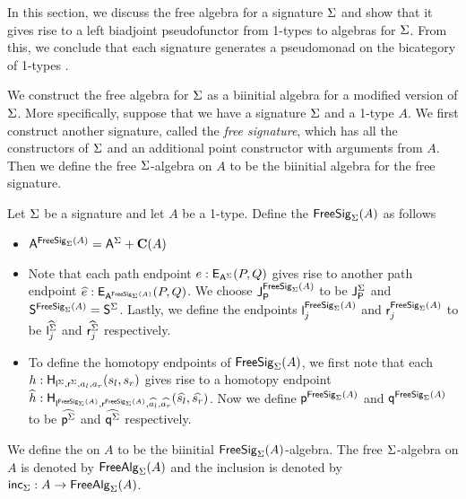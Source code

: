 In this section, we discuss the free algebra for a signature $\sign$ and show that it gives rise to a left biadjoint pseudofunctor from 1-types to algebras for $\sign$.
From this, we conclude that each signature generates a pseudomonad on the bicategory of 1-types \cite{LACK2000179}.

We construct the free algebra for $\sign$ as a biinitial algebra for a modified version of $\sign$.
More specifically, suppose that we have a signature $\sign$ and a 1-type $A$.
We first construct another signature, called the \emph{free signature}, which has all the constructors of $\sign$ and an additional point constructor with arguments from $A$.
Then we define the free $\sign$-algebra on $A$ to be the biinitial algebra for the free signature.

\begin{definition}\label{def:free_alg}
Let $\sign$ be a signature and let $A$ be a 1-type.
Define the  $\freesign{\sign}{A}$ as follows
\begin{itemize}
	\item $\pointconstr[\freesign{\sign}{A}] = \sumP{\pointconstr[\sign]}{\constantP{A}}$
	\item Note that each path endpoint $e : \pathendpoint{\pointconstr[\sign]}{P}{Q}$ gives rise to another path endpoint $\freepath{e} : \pathendpoint{\pointconstr[\freesign{\sign}{A}]}{P}{Q}$.
	We choose $\pathlabel[\freesign{\sign}{A}]$ to be $\pathlabel[\sign]$ and $\patharg[\freesign{\sign}{A}] = \patharg[\sign]$.
	Lastly, we define the endpoints $\pathleft[\freesign{\sign}{A}]_j$ and $\pathright[\freesign{\sign}{A}]_j$ to be $\freepath{\pathleft[\sign]_j}$ and $\freepath{\pathright[\sign]_j}$ respectively.
	\item To define the homotopy endpoints of $\freesign{\sign}{A}$, we first note that each $h : \homotendpoint{\pathleft[\sign]}{\pathright[\sign]}{a_l}{a_r}{s_l}{s_r}$ gives rise to a homotopy endpoint $\freehomot{h} : \homotendpoint{\pathleft[\freesign{\sign}{A}]}{\pathright[\freesign{\sign}{A}]}{\freepath{a_l}}{\freepath{a_r}}{\freepath{s_l}}{\freepath{s_r}}$.
	Now we define $\homotleft[\freesign{\sign}{A}]$ and $\homotright[\freesign{\sign}{A}]$ to be $\freehomot{\homotleft[\sign]}$ and $\freehomot{\homotright[\sign]}$ respectively.
\end{itemize}
We define the  on $A$ to be the biinitial $\freesign{\sign}{A}$-algebra.
The free $\sign$-algebra on $A$ is denoted by $\freealg{\sign}{A}$ and the inclusion is denoted by $\freealginc{\sign} : A \rightarrow \freealg{\sign}{A}$.
\end{definition}

